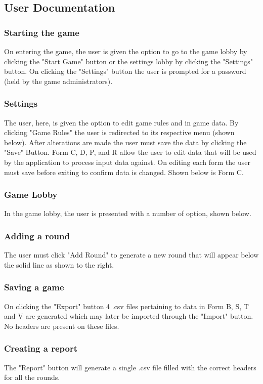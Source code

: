 \documentclass{l3proj}
\begin{document}
\subsection{User Documentation}
\subsubsection{Starting the game}
On entering the game, the user is given the option to go to the game lobby by clicking the "Start Game" button or the settings lobby by clicking the "Settings" button. On clicking the "Settings" button the user is prompted for a password (held by the game administrators).

\subsubsection{Settings}
The user, here, is given the option to edit game rules and in game data. 
By clicking "Game Rules" the user is redirected to its respective menu (shown below). After alterations are made the user must save the data by clicking the "Save" Button.
Form C, D, P, and R allow the user to edit data that will be used by the application to process input data against. On editing each form the user must save before exiting to confirm data is changed. 
Shown below is Form C.
\subsubsection{Game Lobby}
In the game lobby, the user is presented with a number of option, shown below.
\subsubsection{Adding a round}
The user must click "Add Round" to generate a new round that will appear below the solid line as shown to the right.
\subsubsection{Saving a game}
On clicking the "Export" button 4 .csv files pertaining to data in Form B, S, T and V are generated which may later be imported through the "Import" button. No headers are present on these files.
\subsubsection{Creating a report}
The "Report" button will generate a single .csv file filled with the correct headers for all the rounds.
\end{document}
